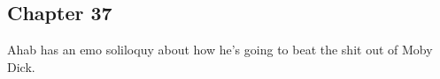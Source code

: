 \subsection{Chapter 37}

Ahab has an emo soliloquy about how he's going to beat the shit out of Moby Dick.
